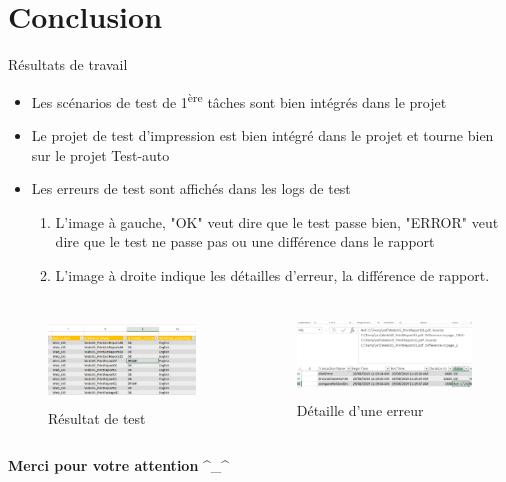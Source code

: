 \documentclass{beamer}
\begin{document}
    \section{Conclusion}
        \begin{frame}
            \begin{alertblock}{Résultats de travail}
                \begin{itemize}
                    \item Les scénarios de test de 1\textsuperscript{ère} tâches sont bien intégrés dans le projet
                    \item Le projet de test d'impression est bien intégré dans le projet et tourne bien sur le projet Test-auto
                    \item Les erreurs de test sont affichés dans les logs de test
                    \begin{enumerate}
                        \item L'image à gauche, "OK" veut dire que le test passe bien, "ERROR" veut dire que le test ne passe pas ou une différence dans le rapport
                        \item L'image à droite indique les détailles d'erreur, la différence de rapport.
                    \end{enumerate}
                \end{itemize}
            \end{alertblock}
            
            \begin{columns}
                \begin{figure}
                    \centering
                    \includegraphics[height=2.4cm]{test_result.PNG}
                    \caption{Résultat de test}
                    \label{fig:result_test_label}
                \end{figure}
                
                \begin{figure}
                    \centering
                    \includegraphics[height=2.2cm]{test_error_detail.PNG}
                    \caption{Détaille d'une erreur}
                    \label{fig:result_error_detail_label}
                \end{figure}
            \end{columns}
        \end{frame}
        
        \begin{frame}
            \begin{center}
                \LARGE{\textbf{Merci pour votre attention }} \textasciicircum\_\textasciicircum
            \end{center}
            
        \end{frame}
\end{document}
